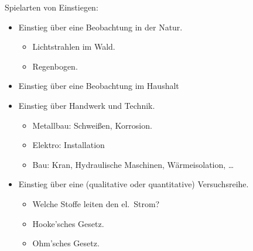 Spielarten von Einstiegen:
\begin{itemize}
	\item
	Einstieg \"{u}ber eine Beobachtung in der Natur.
	\begin{beisp}
		\begin{itemize}
		\item
		Lichtstrahlen im Wald.
		\item
		Regenbogen.
		\end{itemize}

	\end{beisp}
	
	
	\item
	Einstieg \"{u}ber eine Beobachtung im Haushalt
	
	
	\item
	Einstieg \"{u}ber Handwerk und Technik.
	\begin{beisp}
			\begin{itemize}
	\item
	Metallbau: Schwei{\ss}en, Korrosion.
	\item
	Elektro: Installation
	\item
	Bau: Kran, Hydraulische Maschinen, W\"{a}rmeisolation, \dots
	\end{itemize}
	
	\end{beisp}

	\item
	Einstieg \"{u}ber eine (qualitative oder quantitative)
	Versuchsreihe.
	\begin{beisp}
			\begin{itemize}
	\item
	Welche Stoffe leiten den el.\ Strom?
	\item
	Hooke'sches Gesetz.
	\item
	Ohm'sches Gesetz.
	\end{itemize}
	\end{beisp}


\end{itemize}
